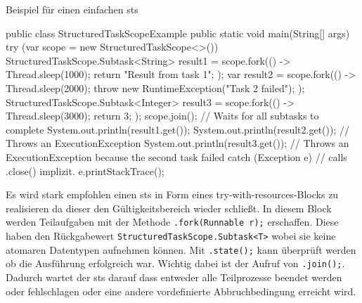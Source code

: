     \begin{program} [H]
        \caption{Beispiel für einen einfachen \gls{sts}}
        \label{prog:BeispielFürEinenEinfachenSts}
    \begin{JavaCode}[language=Java, numbers=left]
public class StructuredTaskScopeExample {
    public static void main(String[] args) {
        try (var scope = new StructuredTaskScope<>()) {
            StructuredTaskScope.Subtask<String> result1 = scope.fork(() -> {
                Thread.sleep(1000);
                return "Result from task 1";
            });
            var result2 = scope.fork(() -> {
                Thread.sleep(2000);
                throw new RuntimeException("Task 2 failed");
            });
            StructuredTaskScope.Subtask<Integer> result3 = scope.fork(() -> {
                Thread.sleep(3000);
                return 3;
            });
            scope.join();                        // Waits for all subtasks to complete
            System.out.println(result1.get());
            System.out.println(result2.get());   // Throws an ExecutionException
            System.out.println(result3.get());   // Throws an ExecutionException because the second task failed
        } catch (Exception e) {                 // calls .close() implizit.
            e.printStackTrace();
        }
    }
}
    \end{JavaCode}
    \end{program}
    Es wird stark empfohlen einen \gls{sts} in Form eines try-with-resources-Blocks zu realisieren da dieser den Gültigkeitsbereich wieder schließt. In diesem Block
    werden Teilaufgaben mit der Methode \texttt{.fork(Runnable r);} erschaffen. Diese haben den Rückgabewert \texttt{StructuredTaskScope.Subtask<T>} wobei sie keine
    atomaren Datentypen aufnehmen können. Mit \texttt{.state();} kann überprüft werden ob die Ausführung erfolgreich war.
    Wichtig dabei ist der Aufruf von \texttt{.join();}. Dadurch wartet der \gls{sts} darauf dass entweder alle Teilprozesse beendet werden oder fehlschlagen oder
    eine andere vordefinierte Abbruchbedingung erreicht wird.
    \cite{oracle21STS}

